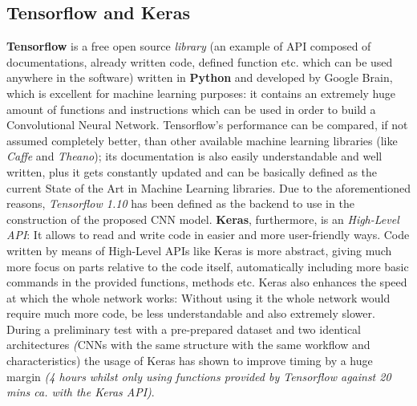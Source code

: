 \documentclass[../main.tex]{subfiles}
\begin{document}
\subsection{Tensorflow and Keras}
\textbf{Tensorflow} is a free open source \textit{library} (an example of API composed of documentations, already written code, defined function etc. which can be used anywhere in the software) written in \textbf{Python} and developed by Google Brain, which is excellent for machine learning purposes\cite{Tensorflow2017}: it contains an extremely huge amount of functions and instructions which can be used in order to build a Convolutional Neural Network. Tensorflow's performance can be compared, if not assumed completely better, than other available machine learning libraries (like \textit{Caffe} and \textit{Theano}); its documentation is also easily understandable and well written, plus it gets constantly updated and can be basically defined as the current State of the Art in Machine Learning libraries. Due to the aforementioned reasons, \textit{Tensorflow 1.10} has been defined as the backend to use in the construction of the proposed CNN model. \textbf{Keras}, furthermore, is an \textit{High-Level API}: It allows to read and write code in easier and more user-friendly ways. Code written by means of High-Level APIs like Keras is more abstract, giving much more focus on parts relative to the code itself, automatically including more basic commands in the provided functions, methods etc. Keras also enhances the speed at which the whole network works: Without using it the whole network would require much more code, be less understandable and also extremely slower. During a preliminary test with a pre-prepared dataset and two identical architectures \textit(CNNs with the same structure with the same workflow and characteristics) the usage of Keras has shown to improve timing by a huge margin \textit{(4 hours whilst only using functions provided by Tensorflow against 20 mins ca. with the Keras API)}. 
\end{document}
